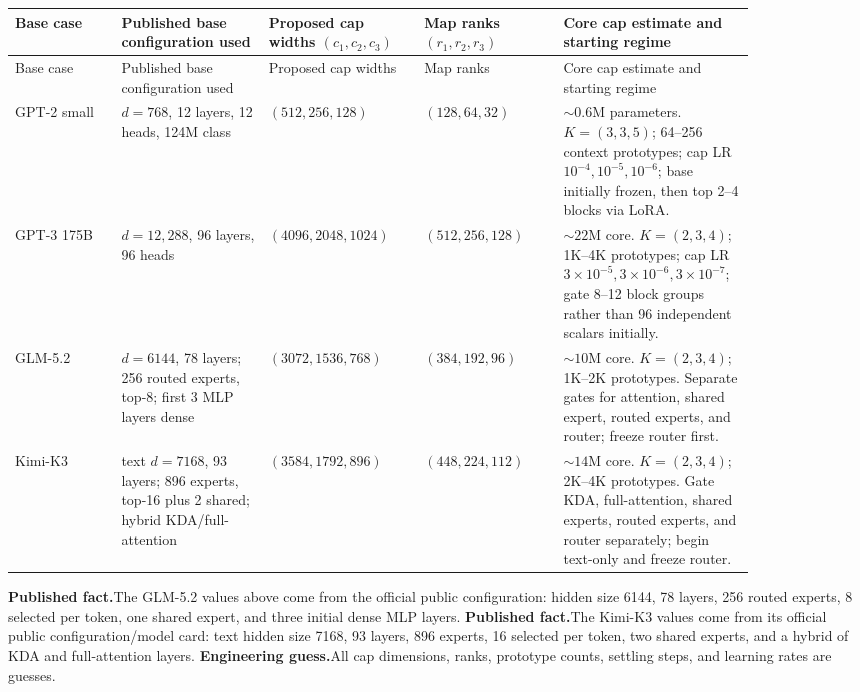 \documentclass[10pt]{article}
\newcommand{\obs}{\textbf{Published fact.}}
\newcommand{\guess}{\textbf{Engineering guess.}}
\begin{document}
\begin{small}
\begin{longtable}{>{\raggedright\arraybackslash}p{0.13\linewidth}
>{\raggedright\arraybackslash}p{0.18\linewidth}
>{\raggedright\arraybackslash}p{0.19\linewidth}
>{\raggedright\arraybackslash}p{0.17\linewidth}
>{\raggedright\arraybackslash}p{0.19\linewidth}}
\toprule
Base case & Published base configuration used & Proposed cap widths $(c_1,c_2,c_3)$ &
Map ranks $(r_1,r_2,r_3)$ & Core cap estimate and starting regime\\
\midrule
\endfirsthead
\toprule
Base case & Published base configuration used & Proposed cap widths &
Map ranks & Core cap estimate and starting regime\\
\midrule
\endhead
GPT-2 small &
$d=768$, 12 layers, 12 heads, 124M class &
$(512,256,128)$ &
$(128,64,32)$ &
$\sim0.6$M parameters. $K=(3,3,5)$; 64--256 context prototypes; cap LR
$10^{-4},10^{-5},10^{-6}$; base initially frozen, then top 2--4 blocks via LoRA.\\
\addlinespace
GPT-3 175B &
$d=12{,}288$, 96 layers, 96 heads &
$(4096,2048,1024)$ &
$(512,256,128)$ &
$\sim22$M core. $K=(2,3,4)$; 1K--4K prototypes; cap LR
$3{\times}10^{-5},3{\times}10^{-6},3{\times}10^{-7}$; gate 8--12 block groups rather
than 96 independent scalars initially.\\
\addlinespace
GLM-5.2 &
$d=6144$, 78 layers; 256 routed experts, top-8; first 3 MLP layers dense &
$(3072,1536,768)$ &
$(384,192,96)$ &
$\sim10$M core. $K=(2,3,4)$; 1K--2K prototypes. Separate gates for attention,
shared expert, routed experts, and router; freeze router first.\\
\addlinespace
Kimi-K3 &
text $d=7168$, 93 layers; 896 experts, top-16 plus 2 shared; hybrid KDA/full-attention &
$(3584,1792,896)$ &
$(448,224,112)$ &
$\sim14$M core. $K=(2,3,4)$; 2K--4K prototypes. Gate KDA, full-attention,
shared experts, routed experts, and router separately; begin text-only and freeze router.\\
\bottomrule
\end{longtable}
\end{small}

\obs The GLM-5.2 values above come from the official public configuration:
hidden size 6144, 78 layers, 256 routed experts, 8 selected per token, one shared expert, and
three initial dense MLP layers.  \obs The Kimi-K3 values come from its official public
configuration/model card: text hidden size 7168, 93 layers, 896 experts, 16 selected per
token, two shared experts, and a hybrid of KDA and full-attention layers.  \guess All cap
dimensions, ranks, prototype counts, settling steps, and learning rates are guesses.
\end{document}
